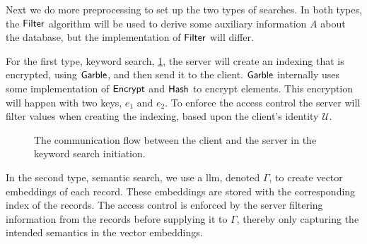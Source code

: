Next we do more preprocessing to set up the two types of searches. In both types, the $ \mathsf{{Filter}} $ algorithm will be used to derive some auxiliary information $ A $ about the database, but the implementation of $ \mathsf{{Filter}} $ will differ. 

For the first type, keyword search, \cref{fig:OverviewInitKeywordSearch}, the server will create an indexing that is encrypted, using $ \mathsf{{Garble}} $, and then send it to the client. $ \mathsf{{Garble}} $ internally uses some implementation of $ \mathsf{{Encrypt}} $ and $ \mathsf{Hash} $ to encrypt elements. This encryption will happen with two keys, $ e_1 $ and $ e_2 $. To enforce the access control the server will filter values when creating the indexing, based upon the client's identity $ \mathcal{U} $. 

\begin{figure}[H]
    \centering
    \captionsetup{justification=centering,margin=1cm}
    \caption{The communication flow between the client and the server in the keyword search initiation.}
    \label{fig:OverviewInitKeywordSearch}
\end{figure}

In the second type, semantic search, we use a \acrshort{llm}, denoted $ \Gamma $, to create vector embeddings of each record. These embeddings are stored with the corresponding index of the records. The access control is enforced by the server filtering information from the records before supplying it to $ \Gamma $, thereby only capturing the intended semantics in the vector embeddings.

